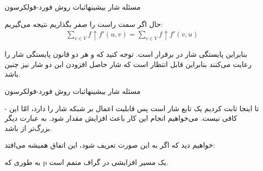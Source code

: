 \begin{itemframe}{مسئله شار بیشینه}{اثبات روش فورد-فولکرسون}
\item
حال اگر سمت راست  را صفر بگذاریم نتیجه می‌گیریم:
\begin{align*}
\sum_{v\in V} f \uparrow f'(u, v)  = \sum_{v\in V} f \uparrow f'(v, u)
\end{align*}

\item
بنابراین پایستگی شار در
برقرار است. توجه کنید که
و
هر دو قانون پایستگی شار را رعایت می‌کنند بنابراین قابل انتظار است که شار حاصل افزودن این دو شار نیز چنین باشد.
\end{itemframe}
\begin{itemframe}{مسئله شار بیشینه}{اثبات روش فورد-فولکرسون}
\item [-]
تا اینجا ثابت کردیم
یک تابع شار است پس قابلیت اعمال بر شبکه شار را دارد، امّا این کافی نیست. می‌خواهیم انجام این کار باعث افزایش مقدار
شود. به عبارت دیگر
بزرگ‌تر از
باشد.
\item
خواهیم دید که اگر
به این صورت تعریف شود، این اتفاق همیشه می‌افتد:

\item
به طوری که p یک مسیر افزایشی در گراف متمم است.
\end{itemframe}
